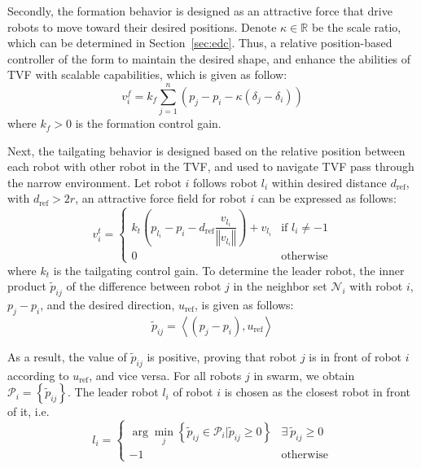 Secondly, the formation behavior is designed as an attractive force that drive robots to move toward their desired positions. Denote $\kappa\in\mathbb{R}$ be the scale ratio, which can be determined in Section~\ref{sec:edc}. Thus, a relative position-based controller of the form to maintain the desired shape, and enhance the abilities of TVF with scalable capabilities, which is given as follow:
\begin{equation}
    v^f_i=k_f\sum_{j=1}^n{\left(p_j-p_i-\kappa\left(\delta_j-\delta_i\right)\right)}
    \label{eqn:1uf}
\end{equation}
where $k_f>0$ is the formation control gain.

Next, the tailgating behavior is designed based on the relative position between each robot with other robot in the TVF, and used to navigate TVF pass through the narrow environment. Let robot $i$ follows robot ${l_i}$ within desired distance $d_\text{ref}$, with $d_\text{ref}>2r$,  an attractive force field for robot $i$ can be expressed as follows:
\begin{equation}
    v_i^t=\begin{cases}
k_t\left(p_{l_i}-p_i-d_\text{ref}\dfrac{v_{l_i}}{\left\Vert v_{l_i}\right\Vert}\right)+v_{l_i} & \text{if } l_i\neq-1\\
0 & \text{otherwise}
\end{cases}
    \label{eqn:1ut}
\end{equation}
where $k_t$ is the tailgating control gain. To determine the leader robot, the inner product $\tilde{p}_{ij}$ of the difference between robot $j$ in the neighbor set $\mathcal{N}_i$ with robot $i$, $p_j-p_i$, and the desired direction, $u_\text{ref}$, is given as follows:
\begin{equation}
    \tilde{p}_{ij} = \left\langle (p_j-p_i),u_\text{ref}\right\rangle
    \label{eqn:1tildep}
\end{equation}

As a result, the value of $\tilde{p}_{ij}$ is positive, proving that robot $j$ is in front of robot $i$ according to $u_\text{ref}$, and vice versa. For all robots $j$ in swarm, we obtain $\mathcal{P}_i=\left\{\tilde{p}_{ij}\right\}$. The leader robot ${l_i}$ of robot $i$ is chosen as the closest robot in front of it, i.e.
\begin{equation}
     l_i=\begin{cases}
    \arg\min_{j}\left\{\tilde{p}_{ij}\in\mathcal{P}_i\vert\tilde{p}_{ij}\geq0\right\} & \exists~\tilde{p}_{ij}\geq0\\ 
    -1 & \text{otherwise}
     \end{cases}
    \label{eqn:1li}
\end{equation}

